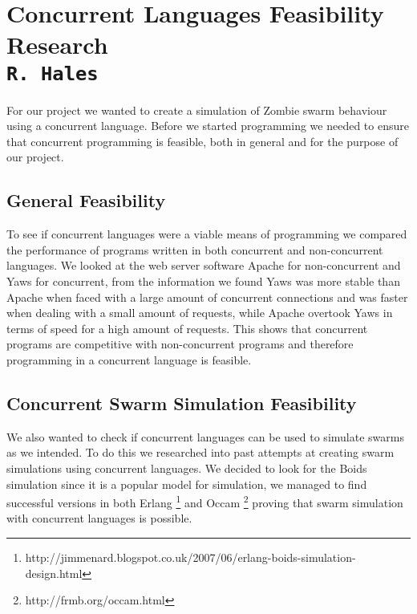 \pagestyle{empty}
\section{Concurrent Languages Feasibility Research\\{\small\tt R.~Hales}}
For our project we wanted to create a simulation of Zombie swarm behaviour using a concurrent language. Before we started programming we needed to ensure that concurrent programming is  feasible, both in general and for the purpose of our project.

\subsection{General Feasibility}
To see if concurrent languages were a viable means of programming we compared the performance of programs written in both concurrent and non-concurrent languages. We looked at the web server software Apache for non-concurrent and Yaws for concurrent, from the information we found Yaws was more stable than Apache when faced with a large amount of concurrent connections and was faster when dealing with a small amount of requests, while Apache overtook Yaws in terms of speed for a high amount of requests. This shows that concurrent programs are competitive with non-concurrent programs and therefore programming in a concurrent language is feasible.

\subsection{Concurrent Swarm Simulation Feasibility}
We also wanted to check if concurrent languages can be used to simulate swarms as we intended. To do this we researched into past attempts at creating swarm simulations using concurrent languages. We decided to look for the Boids simulation since it is a popular model for simulation, we managed to find successful versions in both Erlang \footnote{http://jimmenard.blogspot.co.uk/2007/06/erlang-boids-simulation-design.html} and Occam \footnote{http://frmb.org/occam.html} proving that swarm simulation with concurrent languages is possible.
\clearpage
\endinput
